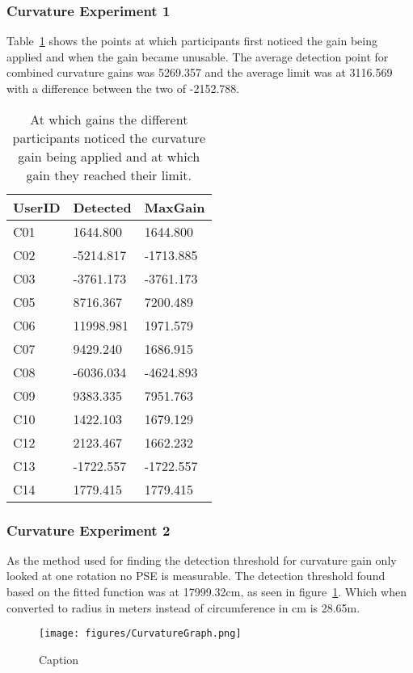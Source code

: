 \subsubsection{Curvature Experiment 1 }
Table~\ref{tab:curvature_increment} shows the points at which participants first noticed the gain being applied and when the gain became unusable. The average detection point for combined curvature gains was 5269.357 and the average limit was at 3116.569 with a difference between the two of -2152.788.

\begin{table}[]
\centering
\begin{tabular}{@{}lll@{}}
\toprule
UserID & Detected  & MaxGain   \\ \midrule
C01    & 1644.800  & 1644.800  \\
C02    & -5214.817 & -1713.885 \\
C03    & -3761.173 & -3761.173 \\
C05    & 8716.367  & 7200.489  \\
C06    & 11998.981 & 1971.579  \\
C07    & 9429.240  & 1686.915  \\
C08    & -6036.034 & -4624.893 \\
C09    & 9383.335  & 7951.763  \\
C10    & 1422.103  & 1679.129  \\
C12    & 2123.467  & 1662.232  \\
C13    & -1722.557 & -1722.557 \\
C14    & 1779.415  & 1779.415  \\ \bottomrule
\end{tabular}
\caption{At which gains the different participants noticed the curvature gain being applied and at which gain they reached their limit.}
\label{tab:curvature_increment}
\end{table}

\subsubsection{Curvature Experiment 2}
As the method used for finding the detection threshold for curvature gain only looked at one rotation no PSE is measurable. The detection threshold found based on the fitted function was at 17999.32cm, as seen in figure~\ref{fig:curvature_graph}. Which when converted to radius in meters instead of circumference in cm is 28.65m.

\begin{figure}
    \centering
    \texttt{[image: figures/CurvatureGraph.png]}
    \caption{Caption}
    \label{fig:curvature_graph}
\end{figure}
